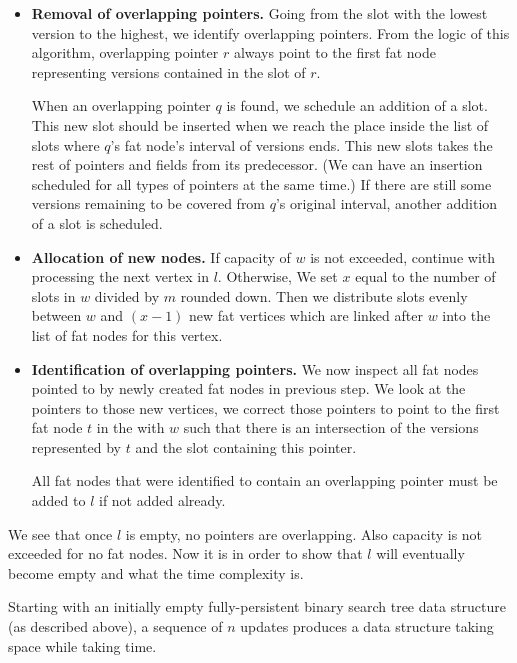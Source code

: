 \begin{itemize}
\item {\bf Removal of overlapping pointers.} Going from the slot with the lowest version to the highest, we identify overlapping pointers. From the logic of this algorithm, overlapping pointer $r$ always point to the first fat node representing versions contained in the slot of $r$. 

When an overlapping pointer $q$ is found, we schedule an addition of a slot. This new slot should be inserted when we reach the place inside the list of slots where $q$'s fat node's interval of versions ends. This new slots takes the rest of pointers and fields from its predecessor. (We can have an insertion scheduled for all types of pointers at the same time.) If there are still some versions remaining to be covered from $q$'s original interval, another addition of a slot is scheduled.

\item {\bf Allocation of new nodes.} If capacity of $w$ is not exceeded, continue with processing the next vertex in $l$. Otherwise, We set $x$ equal to the number of slots in $w$ divided by $m$ rounded down. Then we distribute slots evenly between $w$ and $(x-1)$ new fat vertices which are linked after $w$ into the list of fat nodes for this vertex.

\item {\bf Identification of overlapping pointers.} We now inspect all fat nodes pointed to by newly created fat nodes in previous step. We look at the pointers to those new vertices, we correct those pointers to point to the first fat node $t$ in the with $w$ such that there is an intersection of the versions represented by $t$ and the slot containing this pointer.

All fat nodes that were identified to contain an overlapping pointer must be added to $l$ if not added already.
\end{itemize}



We see that once $l$ is empty, no pointers are overlapping. Also capacity is not exceeded for no fat nodes. Now it is in order to show that $l$ will eventually become empty and what the time complexity is.

\begin{prop}
Starting with an initially empty fully-persistent binary search tree data structure (as described above), a sequence of $n$ updates produces a data structure taking  space while taking  time.
\end{prop}

